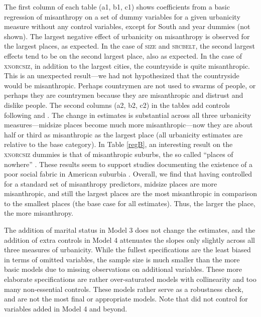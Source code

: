 \documentclass[11pt, letterpaper]{article}
\begin{document}
\begin{spacing}{1.4}
The first column of each table (a1, b1, c1) shows coefficients from a basic
regression of misanthropy on a set of dummy variables for a given urbanicity
measure without any control variables, except for South and year dummies (not shown). 
The largest negative effect of urbanicity on misanthropy is observed for the largest
places, as expected. In the case of \textsc{size} and \textsc{srcbelt}, the second largest effects tend to be on the second largest place, also as expected.  In
the case of \textsc{xnorcsiz}, in addition to the largest cities, the countryside is quite
misanthropic. This is an unexpected result---we had not hypothesized that the countryside would be misanthropic. Perhaps countrymen are not used to swarms of people, or
perhaps they are countrymen because they are misanthropic and distrust and
dislike people. %
The second columns (a2, b2, c2) in the tables add controls following
\citet{welch07} and \citet{smith97}.
 The change in  estimates is substantial across all three urbanicity
 measures---midsize places become much more misanthropic---now they are about
 half or third as misanthropic as the largest place (all urbanicity estimates
 are relative to the base category). 
 In Table \ref{regB}, an interesting result on the
\textsc{xnorcsiz} dummies is that of misanthropic suburbs, the so called ``places of
nowhere'' \citep{kunstler12}. These results seem to support studies documenting the existence of a poor social fabric in American suburbia \citep{duany01,kunstler12,kay97}.
Overall,
 we find that having controlled for a standard set of misanthropy predictors, midsize places are more misanthropic, and still the
 largest places are the most misanthropic in comparison to the smallest
 places (the base case for all estimates).
Thus, the larger the place, the more misanthropy. 

The addition of marital status in Model 3 does not change the estimates, and the addition of extra controls in Model 4 attenuates the slopes only slightly  across
all three measures of urbanicity.
{While the fullest specifications are the least biased in terms of omitted
variables, the sample size is much smaller than the more basic models due to
missing observations on additional variables. These more elaborate
specifications are rather over-saturated models with collinearity and 
too many non-essential controls. These models rather serve as a robustness check, and are not the most final or appropriate models. %
 Note that  \citet{wilson85} did not control for variables added in Model 4 and beyond.}


\end{spacing}
\end{document}

